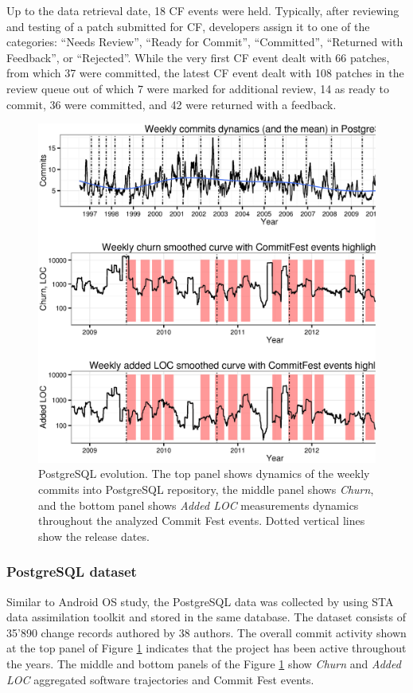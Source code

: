 Up to the data retrieval date, 18 CF events were held. Typically, after reviewing and testing of a patch submitted for CF, developers assign it to one of the categories: ``Needs Review'', ``Ready for Commit'', ``Committed'', ``Returned with Feedback'', or ``Rejected''. While the very first CF event dealt with 66 patches, from which 37 were committed, the latest CF event dealt with 108 patches in the review queue out of which 7 were marked for additional review, 14 as ready to commit, 36 were committed, and 42 were returned with a feedback.

\begin{figure}[t!]
   \centering
   \includegraphics[width=150mm]{figures/postgre_commits_dynamics.eps}
   \caption{PostgreSQL evolution. The top panel shows dynamics of the weekly commits into PostgreSQL repository, the middle panel shows \textit{Churn}, and the bottom panel shows \textit{Added LOC} measurements dynamics throughout the analyzed Commit Fest events. Dotted vertical lines show the release dates.}
   \label{fig:postgre_dynamics}
\end{figure}

\subsubsection{PostgreSQL dataset}
Similar to Android OS study, the PostgreSQL data was collected by using STA data assimilation toolkit and stored in the same database. The dataset consists of 35'890 change records authored by 38 authors. The overall commit activity shown at the top panel of Figure \ref{fig:postgre_dynamics} indicates that the project has been active throughout the years. The middle and bottom panels of the Figure \ref{fig:postgre_dynamics} show \textit{Churn} and \textit{Added LOC} aggregated software trajectories and Commit Fest events.

